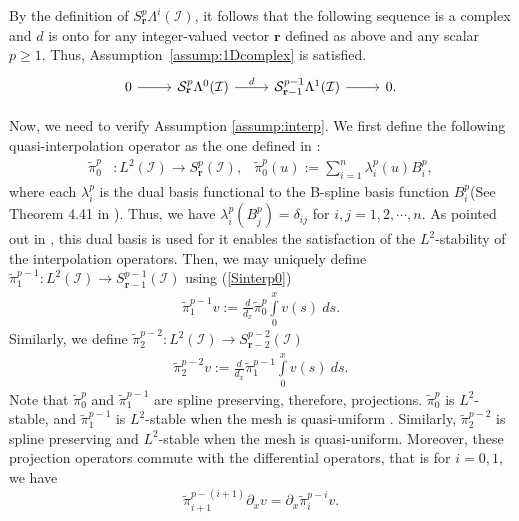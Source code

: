 \documentclass[final]{amsart}%
\newcommand{\0}{\mathaccent23}
\newcommand{\br}{\mathbf r}
\begin{document}
By the definition of $S^p_{\br}\Lambda^i(\mathcal{I})$, it follows that the following sequence is a complex and $d$ is onto for any integer-valued vector $\br$ defined as above and any scalar $p\ge 1$. Thus, Assumption~\ref{assump:1Dcomplex} is satisfied.
\begin{equation*}
\begin{tikzcd}
0 \arrow{r}&\mathcal{S}_{\br}^{p}\Lambda^0(\mathcal{I}) \arrow{r}{d}& \mathcal{S}_{\br-1}^{p-1}\Lambda^1(\mathcal{I})\arrow{r}{}&0.
\end{tikzcd}
\end{equation*}

Now, we need to verify Assumption \ref{assump:interp}. We first define the following quasi-interpolation operator as the one defined in \cite{veig2014var}:
 \begin{align}\label{Sinterp0}
     \tilde{\pi}_{0}^p&: L^2(\mathcal{I}) \to S^p_{\br}(\mathcal{I}),&\tilde{\pi}_{0}^p(u):=\sum\limits_{i=1}^{n} \lambda_i^p(u)B_i^p,
 \end{align}
 where each $\lambda_i^p$ is the dual basis functional to 
 the B-spline basis function $B_i^p$(See Theorem 4.41 in \cite{schumaker}). Thus, we have $\lambda_i^p(B_j^p)=\delta_{ij}$ for $i,j=1,2,\cdots,n$. As pointed out in \cite{veig2014var}, this dual basis is used for it enables the satisfaction of the $L^2$-stability of the interpolation operators.
Then, we may uniquely define $\tilde{\pi}_1^{p-1}:L^2(\mathcal{I}) \to S^{p-1}_{\br-1}(\mathcal{I}) $ using (\ref{Sinterp0})
 \begin{align*}
     \tilde{\pi}_{1}^{p-1}v:=\frac{d}{d_x} \tilde{\pi}_0^p \int\limits_{0}^x v(s)\ ds. 
 \end{align*}
Similarly, we define $\tilde{\pi}_2^{p-2}:L^2(\mathcal{I}) \to S^{p-2}_{\br-2}(\mathcal{I}) $ 
  \begin{align*}
     \tilde{\pi}_{2}^{p-2}v:=\frac{d}{d_x} \tilde{\pi}_1^{p-1} \int\limits_{0}^x v(s)\ ds. 
 \end{align*}
 Note that $\tilde{\pi}_{0}^p$ and $\tilde{\pi}_{1}^{p-1}$ are spline preserving, therefore, projections. $\tilde{\pi}_{0}^p$ is $L^2$-stable, and $\tilde{\pi}_{1}^{p-1}$ is $L^2$-stable when the mesh is quasi-uniform \cite{veig2014var}. Similarly, $\tilde{\pi}_{2}^{p-2}$ is spline preserving and $L^2$-stable when the mesh is quasi-uniform. Moreover, these projection operators commute with the differential operators, that is for $i=0,1$, we have
\begin{equation}\label{S:dpicommute}
    \tilde{\pi}_{i+1}^{p-(i+1)} \partial_x v= \partial_x  \tilde{\pi}_{i}^{p-i} v.
\end{equation} 
\end{document}
